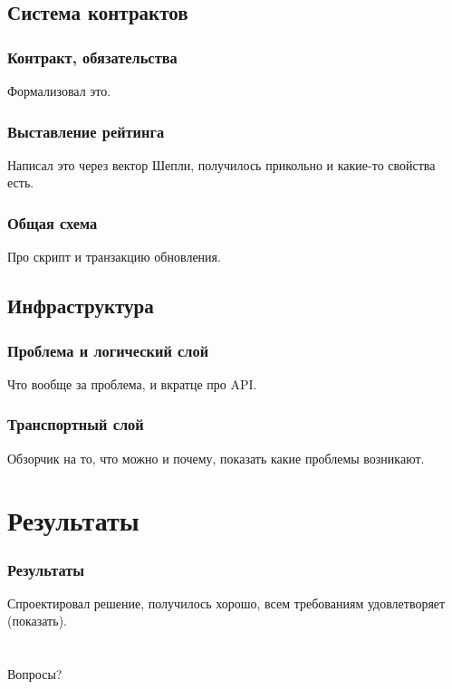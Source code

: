\documentclass[11pt,handout,pdf,hyperref={unicode}]{beamer}
\begin{document}
\subsection{Система контрактов}

\begin{frame}
  \frametitle{Контракт, обязательства}

  Формализовал это.
\end{frame}

\begin{frame}
  \frametitle{Выставление рейтинга}

  Написал это через вектор Шепли, получилось прикольно и какие-то
  свойства есть.
\end{frame}

\begin{frame}
  \frametitle{Общая схема}

  Про скрипт и транзакцию обновления.
\end{frame}

\subsection{Инфраструктура}

\begin{frame}
  \frametitle{Проблема и логический слой}

  Что вообще за проблема, и вкратце про API.
\end{frame}

\begin{frame}
  \frametitle{Транспортный слой}

  Обзорчик на то, что можно и почему, показать какие проблемы возникают.
\end{frame}

\section{Результаты}

\begin{frame}
  \frametitle{Результаты}

  Спроектировал решение, получилось хорошо, всем требованиям удовлетворяет (показать).
\end{frame}

\section{}

\begin{frame}

  \begin{center}
    \Huge Вопросы?
  \end{center}

\end{frame}
\end{document}
